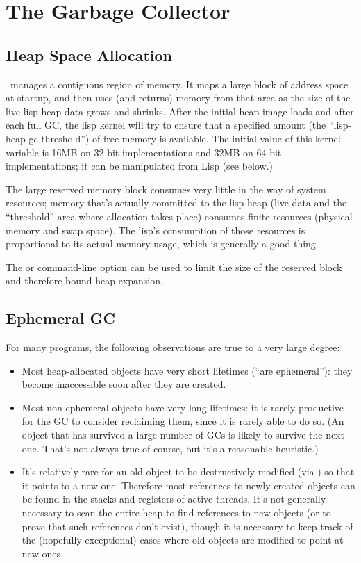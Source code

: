\chapter{The Garbage Collector}

\section{Heap Space Allocation}

\CCL\ manages a contiguous region of memory.  It maps a large block of
address space at startup, and then uses (and returns) memory from that
area as the size of the live lisp heap data grows and shrinks.  After
the initial heap image loads and after each full GC, the lisp kernel
will try to ensure that a specified amount (the
``lisp-heap-gc-threshold'') of free memory is available. The initial
value of this kernel variable is 16MB on 32-bit implementations and
32MB on 64-bit implementations; it can be manipulated from Lisp (see
below.)

The large reserved memory block consumes very little in the way of
system resources; memory that's actually committed to the lisp heap
(live data and the ``threshold'' area where allocation takes place)
consumes finite resources (physical memory and swap space). The lisp's
consumption of those resources is proportional to its actual memory
usage, which is generally a good thing.

The  or  command-line option can be used to
limit the size of the reserved block and therefore bound heap
expansion.

\section{Ephemeral GC}

For many programs, the following observations are true to a very large
degree:

\begin{itemize}
\item
  Most heap-allocated objects have very short lifetimes (``are
  ephemeral''): they become inaccessible soon after they are created.

\item
  Most non-ephemeral objects have very long lifetimes: it is rarely
  productive for the GC to consider reclaiming them, since it is rarely
  able to do so. (An object that has survived a large number of GCs is
  likely to survive the next one. That's not always true of course,
  but it's a reasonable heuristic.)

\item
  It's relatively rare for an old object to be destructively modified
  (via ) so that it points to a new one. Therefore most
  references to newly-created objects can be found in the stacks and
  registers of active threads. It's not generally necessary to scan
  the entire heap to find references to new objects (or to prove that
  such references don't exist), though it is necessary to keep track
  of the (hopefully exceptional) cases where old objects are modified
  to point at new ones.
\end{itemize}

